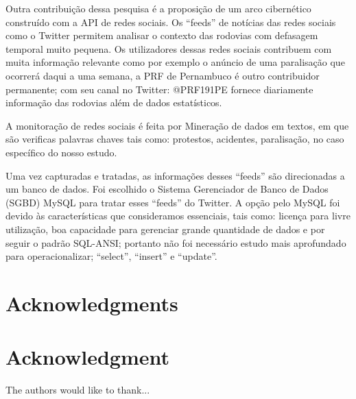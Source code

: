 \documentclass[conference,compsoc]{IEEEtran}
\begin{document}
Outra contribuição dessa pesquisa é a proposição de um arco cibernético construído com a API de redes sociais.
Os ``feeds'' de notícias das redes sociais como o Twitter permitem analisar o contexto das rodovias com defasagem temporal muito pequena.
Os utilizadores dessas redes sociais contribuem com muita informação relevante como por exemplo o anúncio de uma paralisação que ocorrerá 
daqui a uma semana, a PRF de Pernambuco é outro contribuidor permanente; com seu canal no Twitter: @PRF191PE fornece diariamente informação das rodovias 
além de dados estatísticos. 

A monitoração de redes sociais é feita por Mineração de dados em textos, em que são verificas palavras chaves tais como: protestos, acidentes, paralisação, no caso
específico do nosso estudo.

Uma vez capturadas e tratadas, as informações desses ``feeds'' são direcionadas a um banco de dados. 
Foi escolhido o Sistema Gerenciador de Banco de Dados (SGBD) MySQL para tratar esses ``feeds'' do Twitter. 
A opção pelo MySQL foi devido às características que consideramos essenciais, tais como: licença para livre utilização, boa capacidade para gerenciar grande quantidade de 
dados e por seguir o padrão SQL-ANSI; portanto não foi necessário estudo mais aprofundado para operacionalizar; ``select'', ``insert'' e ``update''.





\ifCLASSOPTIONcompsoc
  \section*{Acknowledgments}
\else
  \section*{Acknowledgment}
\fi


The authors would like to thank...
\end{document}

